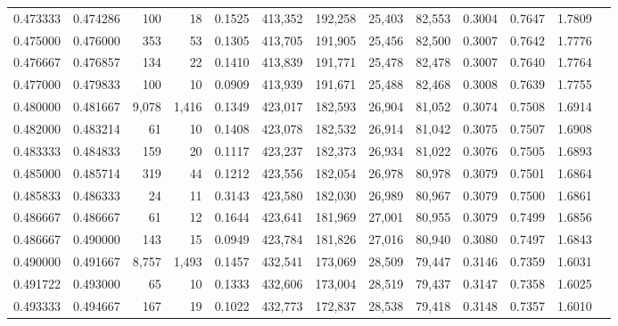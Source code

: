 \begin{tabular}{rrrrrrrrrrrrr}
0.473333 & 0.474286 &    100 &    18 &                                     0.1525 & 413,352 & 192,258 &  25,403 &  82,553 & 0.3004 & 0.7647 & 1.7809 \\
0.475000 & 0.476000 &    353 &    53 &                                     0.1305 & 413,705 & 191,905 &  25,456 &  82,500 & 0.3007 & 0.7642 & 1.7776 \\
0.476667 & 0.476857 &    134 &    22 &                                     0.1410 & 413,839 & 191,771 &  25,478 &  82,478 & 0.3007 & 0.7640 & 1.7764 \\
0.477000 & 0.479833 &    100 &    10 &                                     0.0909 & 413,939 & 191,671 &  25,488 &  82,468 & 0.3008 & 0.7639 & 1.7755 \\
0.480000 & 0.481667 &  9,078 & 1,416 &                                     0.1349 & 423,017 & 182,593 &  26,904 &  81,052 & 0.3074 & 0.7508 & 1.6914 \\
0.482000 & 0.483214 &     61 &    10 &                                     0.1408 & 423,078 & 182,532 &  26,914 &  81,042 & 0.3075 & 0.7507 & 1.6908 \\
0.483333 & 0.484833 &    159 &    20 &                                     0.1117 & 423,237 & 182,373 &  26,934 &  81,022 & 0.3076 & 0.7505 & 1.6893 \\
0.485000 & 0.485714 &    319 &    44 &                                     0.1212 & 423,556 & 182,054 &  26,978 &  80,978 & 0.3079 & 0.7501 & 1.6864 \\
0.485833 & 0.486333 &     24 &    11 &                                     0.3143 & 423,580 & 182,030 &  26,989 &  80,967 & 0.3079 & 0.7500 & 1.6861 \\
0.486667 & 0.486667 &     61 &    12 &                                     0.1644 & 423,641 & 181,969 &  27,001 &  80,955 & 0.3079 & 0.7499 & 1.6856 \\
0.486667 & 0.490000 &    143 &    15 &                                     0.0949 & 423,784 & 181,826 &  27,016 &  80,940 & 0.3080 & 0.7497 & 1.6843 \\
0.490000 & 0.491667 &  8,757 & 1,493 &                                     0.1457 & 432,541 & 173,069 &  28,509 &  79,447 & 0.3146 & 0.7359 & 1.6031 \\
0.491722 & 0.493000 &     65 &    10 &                                     0.1333 & 432,606 & 173,004 &  28,519 &  79,437 & 0.3147 & 0.7358 & 1.6025 \\
0.493333 & 0.494667 &    167 &    19 &                                     0.1022 & 432,773 & 172,837 &  28,538 &  79,418 & 0.3148 & 0.7357 & 1.6010 \\

\end{tabular}

